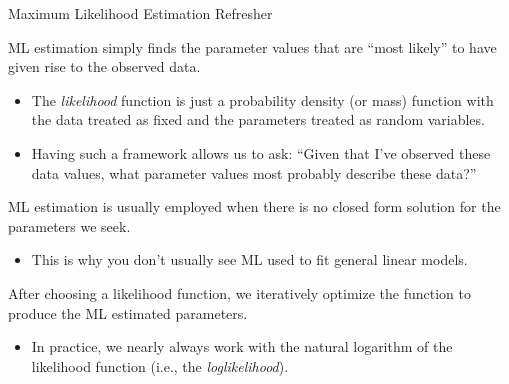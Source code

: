 \documentclass{beamer}\usepackage[]{graphicx}\usepackage[]{color}
\begin{document}
\begin{frame}[allowframebreaks]{Maximum Likelihood Estimation Refresher}

  ML estimation simply finds the parameter values that are ``most likely'' to 
  have given rise to the observed data.
  \vb
  \begin{itemize}
  \item The \emph{likelihood} function is just a probability density (or mass) 
    function with the data treated as fixed and the parameters treated as 
    random variables.
    \vb
  \item Having such a framework allows us to ask: ``Given that I've observed 
    these data values, what parameter values most probably describe these 
    data?''
  \end{itemize}
  
  \pagebreak
  
  ML estimation is usually employed when there is no closed form solution for 
  the parameters we seek.
  \vb
  \begin{itemize}
  \item This is why you don't usually see ML used to fit general linear models.
  \end{itemize}
  \vb
  After choosing a likelihood function, we iteratively optimize the function to 
  produce the ML estimated parameters.
  \vb
  \begin{itemize}
  \item In practice, we nearly always work with the natural logarithm of the 
    likelihood function (i.e., the \emph{loglikelihood}).
  \end{itemize}
  
\end{frame}

\watermarkoff %
\end{document}
